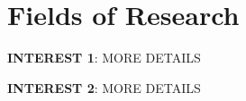 \vspace{0.2in}
\section{Fields of Research} %
\label{sec:research_backg}
\vspace{-0.25in}
\begin{outerlist}
	\item {\bf INTEREST 1}: MORE DETAILS	\item {\bf INTEREST 2}: MORE DETAILS

\end{outerlist}
